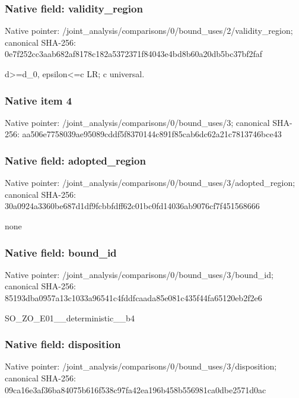 \documentclass[10pt,a4paper]{article}
\begin{document}
\subsubsection{Native field: validity\_\allowbreak{}region}
Native pointer: /joint\_\allowbreak{}analysis/comparisons/0/bound\_\allowbreak{}uses/2/validity\_\allowbreak{}region; canonical SHA-256: 0e7f252cc3aab682af8178c182a5372371f84043e4bd8b60a20db5bc37bf2faf

\begingroup\raggedright\sloppy d>=\allowbreak{}d\_\allowbreak{}0,\allowbreak{} epsilon<=\allowbreak{}c LR;\allowbreak{} c universal.\par\endgroup

\subsubsection{Native item 4}
Native pointer: /joint\_\allowbreak{}analysis/comparisons/0/bound\_\allowbreak{}uses/3; canonical SHA-256: aa506e7758039ae95089cddf5f8370144c891f85cab6dc62a21c7813746bce43

\subsubsection{Native field: adopted\_\allowbreak{}region}
Native pointer: /joint\_\allowbreak{}analysis/comparisons/0/bound\_\allowbreak{}uses/3/adopted\_\allowbreak{}region; canonical SHA-256: 30a0924a3360be687d1df9fcbbfdff62c01bc0fd14036ab9076cf7f451568666

\begingroup\raggedright\sloppy none\par\endgroup

\subsubsection{Native field: bound\_\allowbreak{}id}
Native pointer: /joint\_\allowbreak{}analysis/comparisons/0/bound\_\allowbreak{}uses/3/bound\_\allowbreak{}id; canonical SHA-256: 85193dba0957a13c1033a96541c4fddfcaada85e081c435f44fa65120eb2f2e6

\begingroup\raggedright\sloppy SO\_\allowbreak{}ZO\_\allowbreak{}E01\_\allowbreak{}\_\allowbreak{}deterministic\_\allowbreak{}\_\allowbreak{}b4\par\endgroup

\subsubsection{Native field: disposition}
Native pointer: /joint\_\allowbreak{}analysis/comparisons/0/bound\_\allowbreak{}uses/3/disposition; canonical SHA-256: 09ca16e3af36ba84075b616f538c97fa42ea196b458b556981ca0dbe2571d0ac
\end{document}
